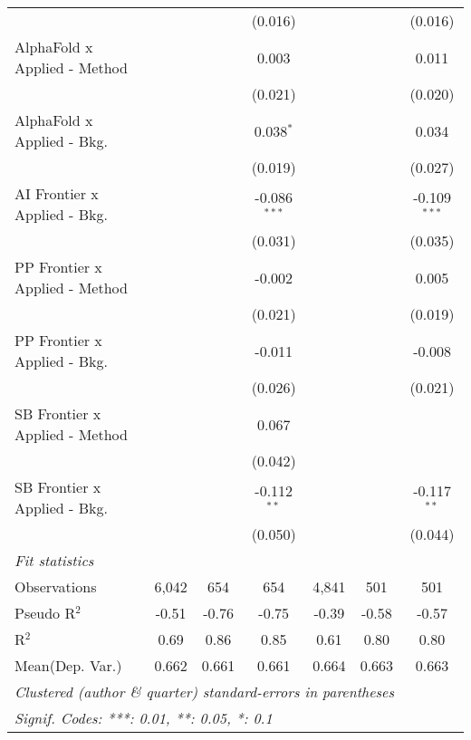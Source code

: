 \begin{tabular}{lcccccc}
                                  &         &              & (0.016)        &         &               & (0.016)\\   
   AlphaFold x Applied - Method   &         &              & 0.003          &         &               & 0.011\\   
                                  &         &              & (0.021)        &         &               & (0.020)\\   
   AlphaFold x Applied - Bkg.     &         &              & 0.038$^{*}$    &         &               & 0.034\\   
                                  &         &              & (0.019)        &         &               & (0.027)\\   
   AI Frontier x Applied - Bkg.   &         &              & -0.086$^{***}$ &         &               & -0.109$^{***}$\\   
                                  &         &              & (0.031)        &         &               & (0.035)\\   
   PP Frontier x Applied - Method &         &              & -0.002         &         &               & 0.005\\   
                                  &         &              & (0.021)        &         &               & (0.019)\\   
   PP Frontier x Applied - Bkg.   &         &              & -0.011         &         &               & -0.008\\   
                                  &         &              & (0.026)        &         &               & (0.021)\\   
   SB Frontier x Applied - Method &         &              & 0.067          &         &               &   \\   
                                  &         &              & (0.042)        &         &               &   \\   
   SB Frontier x Applied - Bkg.   &         &              & -0.112$^{**}$  &         &               & -0.117$^{**}$\\   
                                  &         &              & (0.050)        &         &               & (0.044)\\   
   \midrule
   \emph{Fit statistics}\\
   Observations                   & 6,042   & 654          & 654            & 4,841   & 501           & 501\\  
   Pseudo R$^2$                   & -0.51   & -0.76        & -0.75          & -0.39   & -0.58         & -0.57\\  
   R$^2$                          & 0.69    & 0.86         & 0.85           & 0.61    & 0.80          & 0.80\\  
Mean(Dep. Var.) & 0.662 & 0.661 & 0.661 & 0.664 & 0.663 & 0.663 \\
   \midrule \midrule
   \multicolumn{7}{l}{\emph{Clustered (author \& quarter) standard-errors in parentheses}}\\
   \multicolumn{7}{l}{\emph{Signif. Codes: ***: 0.01, **: 0.05, *: 0.1}}\\
\end{tabular}
\par\endgroup
